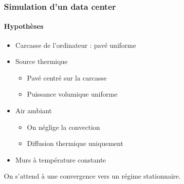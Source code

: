 \documentclass[a4paper,11pt]{beamer}
\begin{document}
\begin{frame}
    \frametitle{Simulation d'un data center}
    \framesubtitle{Hypothèses}

    \begin{itemize}
        \item Carcasse de l'ordinateur : pavé uniforme
        \item Source thermique
        \begin{itemize}
            \item Pavé centré sur la carcasse
            \item Puissance volumique uniforme
        \end{itemize}
        \item Air ambiant
        \begin{itemize}
            \item On néglige la convection
            \item Diffusion thermique uniquement
        \end{itemize}
        \item Murs à température constante
    \end{itemize}

    On s'attend à une convergence vers un régime stationnaire.
\end{frame}
\end{document}
